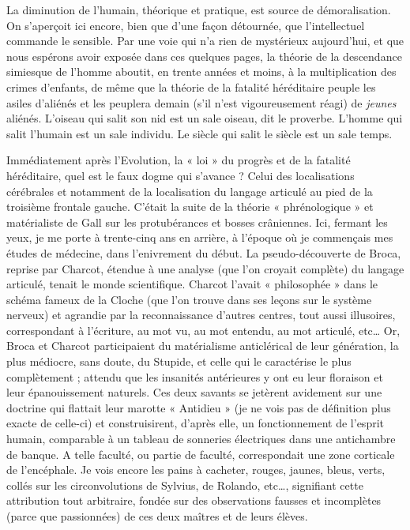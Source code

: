 \documentclass[french,twoside]{book} %
\begin{document}
La diminution de l’humain, théorique et pratique, est source de démoralisation. On s’aperçoit ici encore, bien que d’une façon détournée, que l’intellectuel commande le sensible. Par une voie qui n’a rien de mystérieux aujourd’hui, et que nous espérons avoir exposée dans ces quelques pages, la théorie de la descendance simiesque de l’homme aboutit, en trente années et moins, à la multiplication des crimes d’enfants, de même que la théorie de la fatalité héréditaire peuple les asiles d’aliénés et les peuplera demain (s’il n’est vigoureusement réagi) de {\itshape jeunes} aliénés. L’oiseau qui salit son nid est un sale oiseau, dit le proverbe. L’homme qui salit l’humain est un sale individu. Le siècle qui salit le siècle est un sale temps.\par
Immédiatement après l’Evolution, la « loi » du progrès et de la fatalité héréditaire, quel est le faux dogme qui s’avance ? Celui des localisations cérébrales et notamment de la localisation du langage articulé au pied de la troisième frontale gauche. C’était la suite de la théorie « phrénologique » et matérialiste de Gall sur les protubérances et bosses crâniennes. Ici, fermant les yeux, je me porte à trente-cinq ans en arrière, à l’époque où je commençais mes études de médecine, dans l’enivrement du début. La pseudo-découverte de Broca, reprise par Charcot, étendue à une analyse (que l’on croyait complète) du langage articulé, tenait le monde scientifique. Charcot l’avait « philosophée » dans le schéma fameux de la Cloche (que l’on trouve dans ses leçons sur le système nerveux) et agrandie par la reconnaissance d’autres centres, tout aussi illusoires, correspondant à l’écriture, au mot vu, au mot entendu, au mot articulé, etc… Or, Broca et Charcot participaient du matérialisme anticlérical de leur génération, la plus médiocre, sans doute, du Stupide, et celle qui le caractérise le plus complètement ; attendu que les insanités antérieures y ont eu leur floraison et leur épanouissement naturels. Ces deux savants se jetèrent avidement sur une doctrine qui flattait leur marotte « Antidieu » (je ne vois pas de définition plus exacte de celle-ci) et construisirent, d’après elle, un fonctionnement de l’esprit humain, comparable à un tableau de sonneries électriques dans une antichambre de banque. A telle faculté, ou partie de faculté, correspondait une zone corticale de l’encéphale. Je vois encore les pains à cacheter, rouges, jaunes, bleus, verts, collés sur les circonvolutions de Sylvius, de Rolando, etc…, signifiant cette attribution tout arbitraire, fondée sur des observations fausses et incomplètes (parce que passionnées) de ces deux maîtres et de leurs élèves.\par
\end{document}
